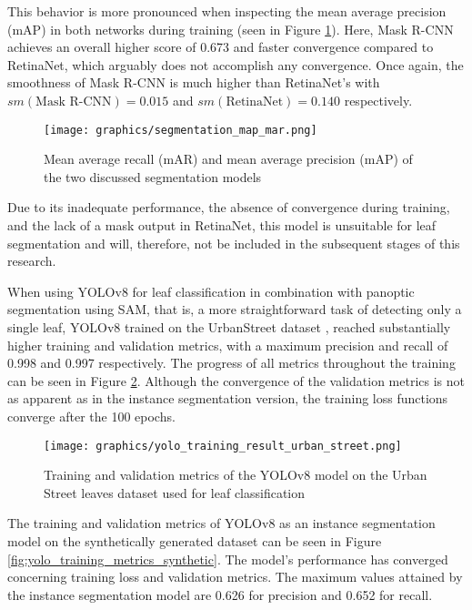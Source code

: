 \documentclass[draft,final]{vutinfth} %
\begin{document}
\begin{appendix}
This behavior is more pronounced when inspecting the mean average precision (mAP) in both networks during training (seen in Figure \ref{fig:seg_precision_recall}). Here, Mask R-CNN achieves an overall higher score of 0.673 and faster convergence compared to RetinaNet, which arguably does not accomplish any convergence. Once again, the smoothness of Mask R-CNN is much higher than RetinaNet's with $sm(\text{Mask R-CNN}) = 0.015$ and $sm(\text{RetinaNet}) = 0.140$ respectively.

\begin{figure}
    \centering
    \texttt{[image: graphics/segmentation\_map\_mar.png]}
    \caption{Mean average recall (mAR) and mean average precision (mAP) of the two discussed segmentation models}
    \label{fig:seg_precision_recall}
\end{figure}

Due to its inadequate performance, the absence of convergence during training, and the lack of a mask output in RetinaNet, this model is unsuitable for leaf segmentation and will, therefore, not be included in the subsequent stages of this research.

When using YOLOv8 for leaf classification in combination with panoptic segmentation using SAM, that is, a more straightforward task of detecting only a single leaf, YOLOv8 trained on the UrbanStreet dataset \cite{yang_urban_2023}, reached substantially higher training and validation metrics, with a maximum precision and recall of 0.998 and 0.997 respectively. The progress of all metrics throughout the training can be seen in Figure \ref{fig:yolo_training_metrics_us}. Although the convergence of the validation metrics is not as apparent as in the instance segmentation version, the training loss functions converge after the 100 epochs.

\begin{figure}
    \centering
    \texttt{[image: graphics/yolo\_training\_result\_urban\_street.png]}
    \caption{Training and validation metrics of the YOLOv8 model on the Urban Street leaves dataset \cite{yang_urban_2023} used for leaf classification}
    \label{fig:yolo_training_metrics_us}
\end{figure}

The training and validation metrics of YOLOv8 as an instance segmentation model on the synthetically generated dataset can be seen in Figure \ref{fig:yolo_training_metrics_synthetic}. The model's performance has converged concerning training loss and validation metrics. The maximum values attained by the instance segmentation model are 0.626 for precision and 0.652 for recall.


\end{appendix}
\end{document}

